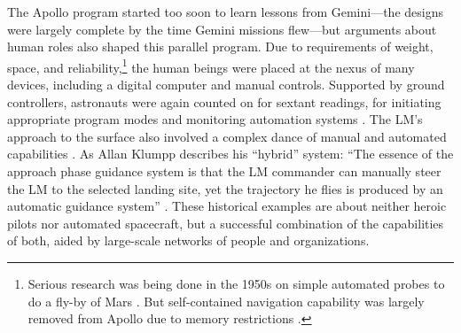 The Apollo program started too soon to learn lessons from
Gemini---the designs were largely complete by the time Gemini
missions flew---but arguments about human roles also shaped this
parallel program. Due to requirements of weight, space, and
reliability,\footnote{Serious
research was being done in the 1950s on simple automated probes to do a fly-by of
Mars \cite[p. 1]{battin}. But self-contained navigation capability was
largely removed from Apollo due to memory restrictions
\cite{tindallMay12}.} the human beings were placed at
the nexus of 
many devices, including a digital computer and manual controls.
Supported by ground controllers, astronauts were 
again counted on for sextant readings, for initiating appropriate
program modes and monitoring automation systems \cite[p.
  4]{BennettExperience}. The LM's approach
to the surface also involved a complex dance of manual and automated
capabilities \cite{BennettCheatham}. As Allan Klumpp describes his
``hybrid'' system: ``The essence of the
approach phase guidance system is that the LM commander can manually
steer the LM to the selected landing site, yet the trajectory he flies
is produced by an automatic guidance system'' \cite[p.
  129--130]{Klumpp}. These 
historical examples are about neither heroic pilots nor
automated spacecraft, but a successful combination of the capabilities
of both, aided by large-scale networks of people and organizations.




